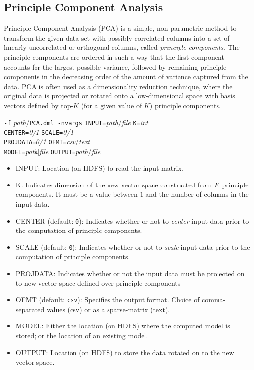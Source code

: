 \subsection{Principle Component Analysis}
\label{pca}


Principle Component Analysis (PCA) is a simple, non-parametric method to transform the given data set with possibly correlated columns into a set of linearly uncorrelated or orthogonal columns, called {\em principle components}. The principle components are ordered in such a way that the first component accounts for the largest possible variance, followed by remaining principle components in the decreasing order of the amount of variance captured from the data. PCA is often used as a dimensionality reduction technique, where the original data is projected or rotated onto a low-dimensional space with basis vectors defined by top-$K$ (for a given value of $K$) principle components.
\\


\begin{tabbing}
\texttt{-f} \textit{path}/\texttt{PCA.dml -nvargs} 
\=\texttt{INPUT=}\textit{path}/\textit{file} 
  \texttt{K=}\textit{int} \\
\>\texttt{CENTER=}\textit{0/1}
  \texttt{SCALE=}\textit{0/1}\\
\>\texttt{PROJDATA=}\textit{0/1}
  \texttt{OFMT=}\textit{csv}/\textit{text}\\
\>\texttt{MODEL=}\textit{path}$\vert$\textit{file}
  \texttt{OUTPUT=}\textit{path}/\textit{file}
\end{tabbing}


\begin{itemize}
\item INPUT: Location (on HDFS) to read the input matrix.
\item K: Indicates dimension of the new vector space constructed from $K$ principle components. It must be a value between $1$ and the number of columns in the input data.
\item CENTER (default: {\tt 0}): Indicates whether or not to {\em center} input data prior to the computation of principle components.
\item SCALE (default: {\tt 0}): Indicates whether or not to {\em scale} input data prior to the computation of principle components.
\item PROJDATA: Indicates whether or not the input data must be projected on to new vector space defined over principle components.
\item OFMT (default: {\tt csv}): Specifies the output format. Choice of comma-separated values (csv) or as a sparse-matrix (text).
\item MODEL: Either the location (on HDFS) where the computed model is stored; or the location of an existing model.
\item OUTPUT: Location (on HDFS) to store the data rotated on to the new vector space.
\end{itemize}

